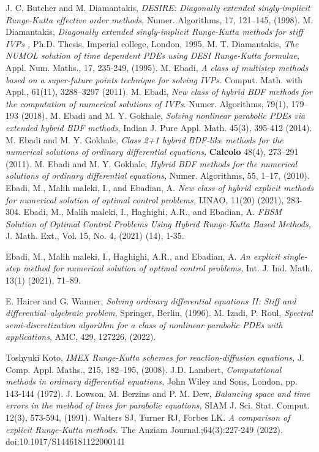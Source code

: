 \documentclass[11pt,twoside, final]{amsart}
\begin{document}
\begin{thebibliography}{}
  J. C. Butcher and M. Diamantakis, \emph{DESIRE: Diagonally extended  singly-implicit Runge-Kutta effective order methods,} Numer. Algorithms, 17, 121--145, (1998).
  M. Diamantakis, \emph{Diagonally extended  singly-implicit Runge-Kutta methods for stiff IVPs ,} Ph.D. Thesis, Imperial college, London, 1995.
 M. T. Diamantakis, \emph{The NUMOL solution of time dependent PDEs using DESI Runge-Kutta formulae,} Appl. Num. Maths., 17, 235-249, (1995).
 M. Ebadi,  {\em A class of multistep methods based on a super-future points technique for solving IVPs.}  Comput. Math. with Appl., 61(11), 3288--3297 (2011).
 M. Ebadi,  {\em New class of hybrid BDF methods for the computation of numerical solutions of IVPs}. Numer. Algorithms, 79(1), 179--193 (2018).
 M. Ebadi and  M. Y. Gokhale, \emph{Solving nonlinear parabolic PDEs via extended hybrid BDF methods,} Indian J. Pure Appl. Math. 45(3), 395-412 (2014).
 M. Ebadi and M. Y. Gokhale, \emph{Class 2+1 hybrid BDF-like methods for the numerical solutions of ordinary differential equations,} \textbf{Calcolo} 48(4), 273--291 (2011).
 M. Ebadi and M. Y. Gokhale,  \emph{Hybrid BDF methods for the numerical solutions of ordinary differential equations,} Numer. Algorithms, 55, 1--17, (2010).
  Ebadi, M., Malih maleki, I.,  and Ebadian, A. \emph{New class of hybrid explicit methods for numerical solution of optimal control problems,} IJNAO, 11(20) (2021), 283-304.
  Ebadi, M., Malih maleki, I., Haghighi, A.R., and Ebadian, A.  \emph{FBSM Solution of Optimal Control Problems
Using Hybrid Runge-Kutta Based Methods,} J. Math. Ext.,
Vol. 15, No. 4, (2021) (14), 1-35.

 Ebadi, M., Malih maleki, I., Haghighi, A.R., and Ebadian, A. \emph{An explicit
single-step method for numerical solution of optimal control problems,} Int.
J. Ind. Math. 13(1) (2021), 71–89.


  E. Hairer and G. Wanner,\emph{ Solving ordinary differential equations II: Stiff and differential--algebraic problem,}  Springer, Berlin, (1996).
M. Izadi, P. Roul,  \emph{Spectral semi-discretization algorithm for a class of nonlinear parabolic PDEs with applications}, AMC, 429, 127226, (2022).


 Toshyuki Koto,  \emph{IMEX Runge-Kutta schemes for reaction-diffusion  equations,} J. Comp. Appl. Maths., 215, 182--195, (2008).
 J.D. Lambert, \emph{Computational methods in ordinary differential equations,}  John Wiley and Sons, London, pp. 143-144 (1972).
 J. Lowson, M. Berzins and P. M. Dew, \emph{Balancing space and time errors in the method of lines for parabolic equations, } SIAM J. Sci. Stat. Comput. 12(3), 573-594, (1991).
Walters SJ, Turner RJ, Forbes LK. \emph{A comparison of explicit Runge-Kutta methods.} The Anziam Journal.;64(3):227-249 (2022). doi:10.1017/S1446181122000141
\end{thebibliography}
\end{document}
